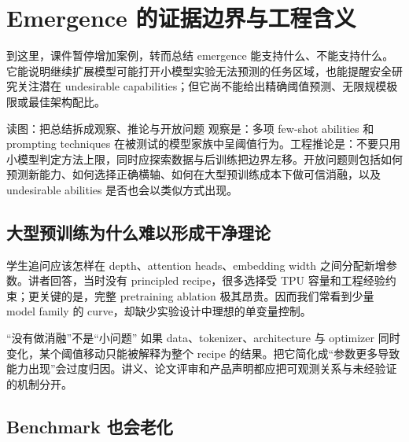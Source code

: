 \section{Emergence 的证据边界与工程含义}

到这里，课件暂停增加案例，转而总结 emergence 能支持什么、不能支持什么。它能说明继续扩展模型可能打开小模型实验无法预测的任务区域，也能提醒安全研究关注潜在 undesirable capabilities；但它尚不能给出精确阈值预测、无限规模极限或最佳架构配比。


\begin{knowledgebox}{读图：把总结拆成观察、推论与开放问题}
观察是：多项 few-shot abilities 和 prompting techniques 在被测试的模型家族中呈阈值行为。工程推论是：不要只用小模型判定方法上限，同时应探索数据与后训练把边界左移。开放问题则包括如何预测新能力、如何选择正确横轴、如何在大型预训练成本下做可信消融，以及 undesirable abilities 是否也会以类似方式出现。
\end{knowledgebox}


\subsection{大型预训练为什么难以形成干净理论}

学生追问应该怎样在 depth、attention heads、embedding width 之间分配新增参数。讲者回答，当时没有 principled recipe，很多选择受 TPU 容量和工程经验约束；更关键的是，完整 pretraining ablation 极其昂贵。因而我们常看到少量 model family 的 curve，却缺少实验设计中理想的单变量控制。

\begin{warningbox}{“没有做消融”不是“小问题”}
如果 data、tokenizer、architecture 与 optimizer 同时变化，某个阈值移动只能被解释为整个 recipe 的结果。把它简化成“参数更多导致能力出现”会过度归因。讲义、论文评审和产品声明都应把可观测关系与未经验证的机制分开。
\end{warningbox}

\subsection{Benchmark 也会老化}

